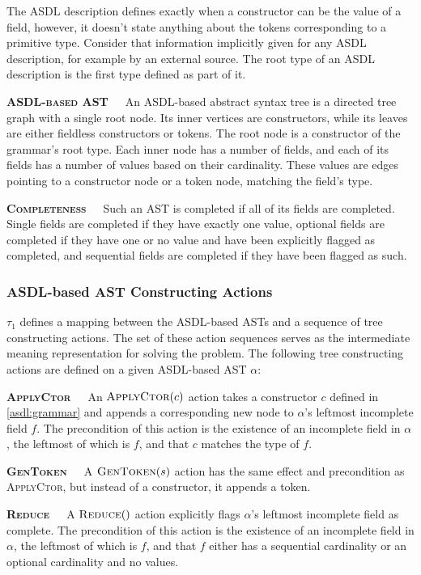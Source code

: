 \noindent
The ASDL description defines exactly when a constructor can be
the value of a field, however, it doesn't state anything about the tokens corresponding
to a primitive type. Consider that information implicitly given for any ASDL
description, for example by an external source. The root type of an ASDL
description is the first type defined as part of it.

\textbf{\textsc{ASDL-based AST}}\ \ \ An ASDL-based abstract syntax tree is a
directed tree graph with a single root node. Its inner vertices are constructors,
while its leaves are either fieldless constructors or tokens. The root node is a
constructor of the grammar's root type. Each inner node has a number of fields,
and each of its fields has a number of values based on their cardinality.
These values are edges pointing to a constructor node or a token node,
matching the field's type.

\textbf{\textsc{Completeness}}\ \ \ Such an AST is completed if all of its fields
are completed. Single fields are completed if they have exactly one value,
optional fields are completed if they have one or no value and have been
explicitly flagged as completed, and sequential fields are completed if
they have been flagged as such. %

\subsubsection{ASDL-based AST Constructing Actions}

\(\tau_{1}\) defines a mapping between the ASDL-based ASTs  and
a sequence of tree constructing actions. The set of these action
sequences serves as the intermediate meaning representation
for solving the problem. The following tree constructing actions
are defined on a given ASDL-based AST \(\alpha\):

\textbf{\textsc{ApplyCtor}}\ \ \ An \(\textsc{ApplyCtor}(c)\) action takes
a constructor \(c\) defined in \cref{asdl:grammar} and appends a corresponding
new node to \(\alpha\)'s leftmost incomplete field \(f\). The precondition of this
action is the existence of an incomplete field in \(\alpha\), the leftmost
of which is \(f\), and that \(c\) matches the type of \(f\).

\textbf{\textsc{GenToken}}\ \ \ A \(\textsc{GenToken}(s)\) action has the
same effect and precondition as \textsc{ApplyCtor}, but instead of a
constructor, it appends a token.

\textbf{\textsc{Reduce}}\ \ \ A \(\textsc{Reduce}()\) action explicitly
flags \(\alpha\)'s leftmost incomplete field as complete. The precondition
of this action is the existence of an incomplete field in \(\alpha\),
the leftmost of which is \(f\), and that \(f\) either has a sequential
cardinality or an optional cardinality and no values.

